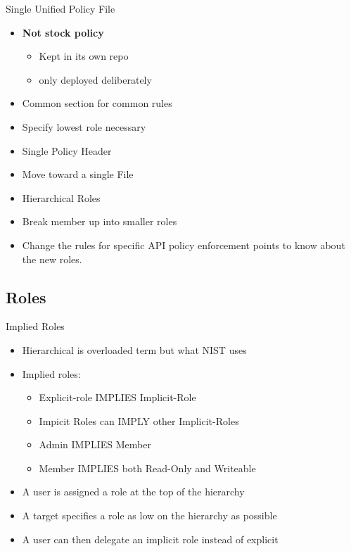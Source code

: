 \documentclass{beamer}
\begin{document}
\begin{frame}{Single Unified Policy File}
  
  \begin{itemize}
  \item  \textbf{Not stock policy}
    \begin{itemize}
    \item Kept in its own repo
    \item only deployed deliberately
    \end {itemize}
  \item Common section for common rules
  \item Specify lowest role necessary
  \item Single Policy Header
  \item Move toward a single File
  \item Hierarchical Roles
  \item Break member up into smaller roles
  \item Change the rules for specific API policy enforcement points to know about the new roles.
  \end{itemize}
\end{frame}


\subsection {Roles}


\begin{frame}{Implied Roles}
  \begin{itemize}
  \item Hierarchical is overloaded term but what NIST uses
  \item Implied roles:
    \begin{itemize}
    \item Explicit-role IMPLIES Implicit-Role
    \item Impicit Roles can IMPLY other Implicit-Roles
    \item Admin IMPLIES Member
    \item Member IMPLIES both Read-Only and Writeable
    \end{itemize}
  \item A user is assigned a role at the top of the hierarchy
  \item A target specifies a role as low on the hierarchy as possible
  \item A user can then delegate an implicit role instead of explicit
  \end{itemize}
\end{frame}
\end{document}
